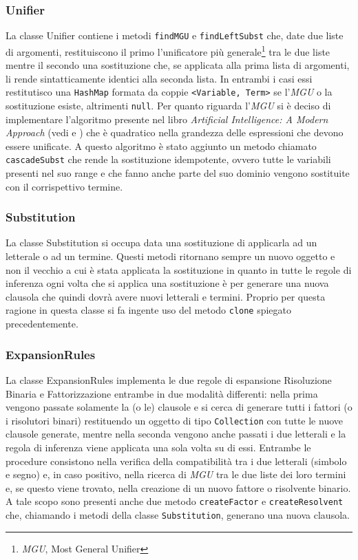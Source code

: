 \documentclass[a4paper,11pt]{article}
\begin{document}
\subsubsection{Unifier}
La classe Unifier contiene i metodi \texttt{findMGU} e \texttt{findLeftSubst} che, date due liste di argomenti, restituiscono il primo l'unificatore più generale\footnote{\emph{MGU}, Most General Unifier} tra le due liste mentre il secondo una sostituzione che, se applicata alla prima lista di argomenti, li rende sintatticamente identici alla seconda lista. In entrambi i casi essi restitutisco una \texttt{HashMap} formata da coppie \texttt{<Variable, Term>} se l'\emph{MGU} o la sostituzione esiste, altrimenti \texttt{null}. Per quanto riguarda l'\emph{MGU} si è deciso di implementare l'algoritmo presente nel libro \emph{Artificial Intelligence: A Modern Approach} (vedi \cite{AIMAbook} e \cite{AIMAalgo}) che è quadratico nella grandezza delle espressioni che devono essere unificate. A questo algoritmo è stato aggiunto un metodo chiamato \texttt{cascadeSubst} che rende la sostituzione idempotente, ovvero tutte le variabili presenti nel suo range e che fanno anche parte del suo dominio vengono sostituite con il corrispettivo termine.
\subsubsection{Substitution}
La classe Substitution si occupa data una sostituzione di applicarla ad un letterale o ad un termine. Questi metodi ritornano sempre un nuovo oggetto e non il vecchio a cui è stata applicata la sostituzione in quanto in tutte le regole di inferenza ogni volta che si applica una sostituzione è per generare una nuova clausola che quindi dovrà avere nuovi letterali e termini. Proprio per questa ragione in questa classe si fa ingente uso del metodo \texttt{clone} spiegato precedentemente.
\subsubsection{ExpansionRules}
La classe ExpansionRules implementa le due regole di espansione Risoluzione Binaria e Fattorizzazione entrambe in due modalità differenti: nella prima vengono passate solamente la (o le) clausole e si cerca di generare tutti i fattori (o i risolutori binari) restituendo un oggetto di tipo \texttt{Collection} con tutte le nuove clausole generate, mentre nella seconda vengono anche passati i due letterali e la regola di inferenza viene applicata una sola volta su di essi. Entrambe le procedure consistono nella verifica della compatibilità tra i due letterali (simbolo e segno) e, in caso positivo, nella ricerca di \emph{MGU} tra le due liste dei loro termini e, se questo viene trovato, nella creazione di un nuovo fattore o risolvente binario. A tale scopo sono presenti anche due metodo \texttt{createFactor} e \texttt{createResolvent} che, chiamando i metodi della classe \texttt{Substitution}, generano una nuova clausola.
\end{document}
